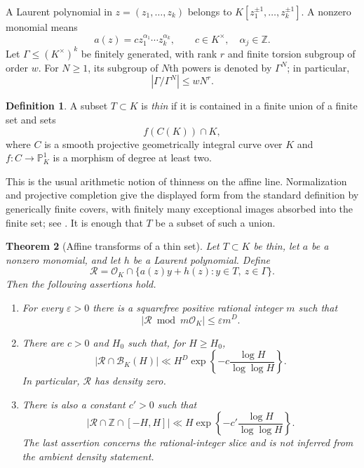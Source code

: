 \documentclass[11pt,a4paper]{article}
\newtheorem{theorem}{Theorem}[section]
\theoremstyle{definition}
\newtheorem{definition}[theorem]{Definition}
\theoremstyle{remark}
\newcommand{\Z}{\mathbb Z}
\newcommand{\Pone}{\mathbb P^1}
\newcommand{\OK}{\mathcal O_K}
\newcommand{\cR}{\mathcal R}
\newcommand{\cB}{\mathcal B}
\begin{document}
A Laurent polynomial in $z=(z_1,\ldots,z_k)$ belongs to
$K[z_1^{\pm1},\ldots,z_k^{\pm1}]$. A nonzero monomial means
\[
 a(z)=c z_1^{\alpha_1}\cdots z_k^{\alpha_k},
 \qquad c\in K^\times,\quad \alpha_j\in\Z.
\]
Let $\Gamma\le(K^\times)^k$ be finitely generated, with rank $r$ and finite
torsion subgroup of order $w$. For $N\ge1$, its subgroup of $N$th powers
is denoted by $\Gamma^N$; in particular,
\begin{equation}\label{eq:groupquotient}
 |\Gamma/\Gamma^N|\le wN^r.
\end{equation}

\begin{definition}\label{def:thin}
A subset $T\subset K$ is \emph{thin} if it is contained in a finite union
of a finite set and sets
\[
 f(C(K))\cap K,
\]
where $C$ is a smooth projective geometrically integral curve over $K$ and
$f:C\to\Pone_K$ is a morphism of degree at least two.
\end{definition}
This is the usual arithmetic notion of thinness on the affine line.
Normalization and projective completion give the displayed form from the
standard definition by generically finite covers, with finitely many
exceptional images absorbed into the finite set; see \cite[Chapter~3]{Serre}.
It is enough that $T$ be a subset of such a union.

\begin{theorem}[Affine transforms of a thin set]\label{thm:thin}
Let $T\subset K$ be thin, let $a$ be a nonzero monomial, and let $h$ be a
Laurent polynomial. Define
\begin{equation}\label{eq:Rthin}
 \cR=\OK\cap\{a(z)y+h(z):y\in T,\ z\in\Gamma\}.
\end{equation}
Then the following assertions hold.
\begin{enumerate}[label=\textup{(\roman*)}]
\item For every $\varepsilon>0$ there is a squarefree positive rational
integer $m$ such that
\[
 |\cR\bmod m\OK|\le\varepsilon m^D.
\]
\item There are $c>0$ and $H_0$ such that, for $H\ge H_0$,
\[
 |\cR\cap\cB_K(H)|\ll H^D
       \exp\left\{-c\frac{\log H}{\log\log H}\right\}.
\]
In particular, $\cR$ has density zero.
\item There is also a constant $c'>0$ such that
\[
 |\cR\cap\Z\cap[-H,H]|\ll H
       \exp\left\{-c'\frac{\log H}{\log\log H}\right\}.
\]
The last assertion concerns the rational-integer slice and is not inferred
from the ambient density statement.
\end{enumerate}
\end{theorem}
\end{document}
